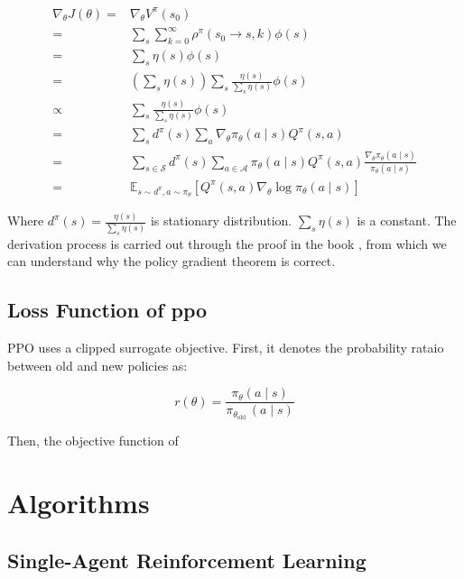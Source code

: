 \begin{appendices}
	\begin{equation}
	\begin{aligned}
	\nabla_{\theta} J(\theta)=&\nabla_{\theta} V^{\pi}\left(s_{0}\right) \\
	=& \sum_{s} \sum_{k=0}^{\infty} \rho^{\pi}\left(s_{0} \rightarrow s, k\right) \phi(s) \\
	=& \sum_{s} \eta(s) \phi(s) \\
	=& \left(\sum_{s} \eta(s)\right) \sum_{s} \frac{\eta(s)}{\sum_{s} \eta(s)} \phi(s) \\
	\propto&  \sum_{s} \frac{\eta(s)}{\sum_{s} \eta(s)} \phi(s) \\
	=& \sum_{s} d^{\pi}(s) \sum_{a} \nabla_{\theta} \pi_{\theta}(a \mid s) Q^{\pi}(s, a) \\
	=& \sum_{s \in \mathcal{S}} d^{\pi}(s) \sum_{a \in \mathcal{A}} \pi_{\theta}(a \mid s) Q^{\pi}(s, a) \frac{\nabla_{\theta} \pi_{\theta}(a \mid s)}{\pi_{\theta}(a \mid s)} \\
	=& \mathbb{E}_{s \sim d^{\pi}, a \sim \pi_{\theta}}\left[Q^{\pi}(s, a) \nabla_{\theta} \log \pi_{\theta}(a \mid s)\right]
	\end{aligned}
	\end{equation}
	
	Where $d^{\pi}(s)=\frac{\eta(s)}{\sum_{s} \eta(s)}$ is stationary distribution. $\sum_{s} \eta(s)$ is a constant. The derivation process is carried out through the proof in the book \parencite{Sutton2018}, from which we can understand why the policy gradient theorem is correct. 
	
	\section{Loss Function of \gls{ppo}} \label{appendix-derivation-process-loss-ppo}
	PPO uses a clipped surrogate objective. First, it denotes the probability rataio between old and new policies as:
	
	\begin{equation}
	r(\theta)=\frac{\pi_{\theta}(a \mid s)}{\pi_{\theta_{\text {old }}}(a \mid s)}
	\end{equation}
	
	Then, the objective function of 
	
  \chapter{Algorithms} \label{appendices-algorithms}
  \section{Single-Agent Reinforcement Learning}

\end{appendices}
